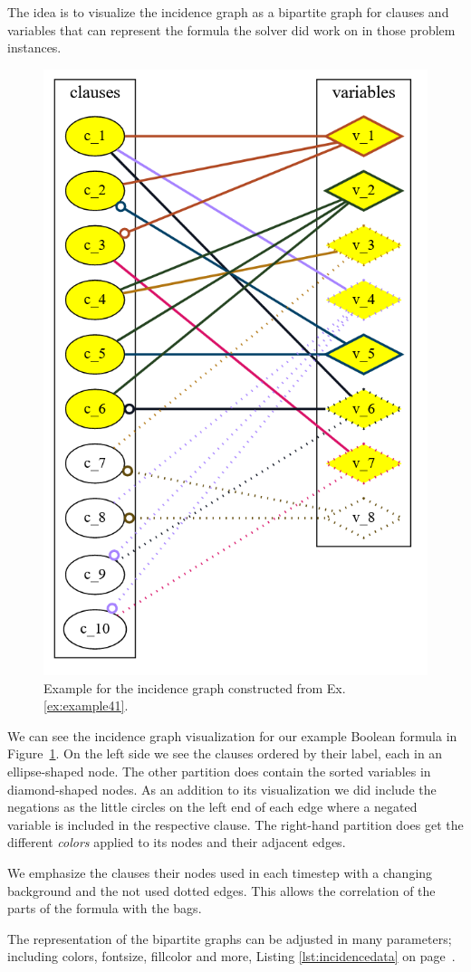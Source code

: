 \documentclass[a4paper, 12pt, bibliography=totoc]{scrartcl}
\begin{document}
The idea is to visualize the incidence graph as a bipartite graph for clauses and variables that can represent the formula the solver did work on in those problem instances.

\begin{figure}[H]
	\centering
	\includegraphics[width=0.4\linewidth]{images/IncidenceStep6.png}
	\caption[Example for the incidence graph]{Example for the incidence graph constructed from Ex. \ref{ex:example41}.}
	\label{fig:incidencestep6}
\end{figure}

 We can see the incidence graph visualization for our example Boolean formula in Figure~\ref{fig:incidencestep6}. On the left side we see the clauses ordered by their label, each in an ellipse-shaped node. The other partition does contain the sorted variables in diamond-shaped nodes. As an addition to its visualization we did include the negations as the little circles on the left end of each edge where a negated variable is included in the respective clause. The right-hand partition does get the different \textit{colors} applied to its nodes and their adjacent edges.
 
 We emphasize the clauses their nodes used in each timestep with a changing background and the not used dotted edges. This allows the correlation of the  parts of the formula with the bags.  

The representation of the bipartite graphs can be adjusted in many parameters; including colors, fontsize, fillcolor and more, Listing \ref{lst:incidencedata} on page~\pageref{lst:incidencedata}.

\end{document}
